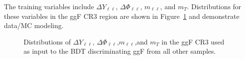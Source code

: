 The training variables include $\Delta Y_{\ell\ell}$, $\Delta \Phi_{\ell\ell}$, $m_{\ell\ell}$, and $m_T$. Distributions for these variables in the ggF CR3 region are shown in Figure~\ref{fig:ggFCR3} and demonstrate data/MC modeling.
\begin{figure}[!h]
  \hfill
  \hfill
  \hfill
  \hfill
{\caption{Distributions of $\Delta Y_{\ell\ell}$, $\Delta \Phi_{\ell\ell}$,$m_{\ell\ell}$,and $m_T$ in the ggF CR3 used as input to the BDT discriminating ggF from all other samples.
\label{fig:ggFCR3}}}
\end{figure} 

